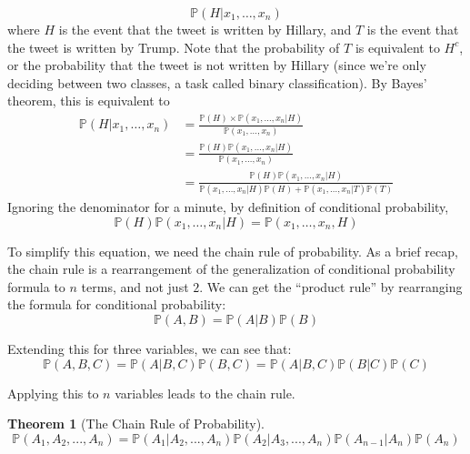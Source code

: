 \documentclass[12pt]{article} \usepackage{amsmath,amssymb,amsthm}
\newtheorem{theorem}{Theorem}[section] \newtheorem*{remark}{Remark}
\begin{document}
$$\mathbb{P}(H|x_1, \dots, x_n)$$
where $H$ is the event that the tweet is written by Hillary, and $T$ is the
event that the tweet is written by Trump. Note that the probability of $T$ is
equivalent to $H^c$, or the probability that the tweet is not written by Hillary
(since we're only deciding between two classes, a task called binary
classification). By Bayes' theorem, this is equivalent to
\begin{equation}
\begin{split}
  \mathbb{P}(H|x_1, \dots, x_n) &= \frac{\mathbb{P}(H) \times
                                  \mathbb{P}(x_1, \dots, x_n|H)}{\mathbb{P}(x_1, \dots, x_n)}\\
                                &= \frac{\mathbb{P}(H)\mathbb{P}(x_1, \dots, x_n|H)}{\mathbb{P}(x_1, \dots,
                                  x_n)}\\ 
                                &= \frac{\mathbb{P}(H)\mathbb{P}(x_1, \dots, x_n|H)}{\mathbb{P}(x_1,
                                  \dots, x_n|H)\mathbb{P}(H)+\mathbb{P}(x_1, \dots, x_n|T)\mathbb{P}(T)}
\end{split}
\end{equation}
Ignoring the denominator for a minute, by definition of conditional probability,
$$\mathbb{P}(H)\mathbb{P}(x_1, \dots, x_n|H) = \mathbb{P}(x_1, \dots, x_n, H)$$

To simplify this equation, we need the chain rule of probability. As a brief
recap, the chain rule is a rearrangement of the generalization of conditional
probability formula to $n$ terms, and not just $2$. We can get the ``product
rule'' by rearranging the formula for conditional probability:
$$\mathbb{P}(A,B) = \mathbb{P}(A|B) \mathbb{P}(B)$$

Extending this for three variables, we can see that:
$$\mathbb{P}(A,B,C) = \mathbb{P}(A|B,C) \mathbb{P}(B,C) = \mathbb{P}(A|B,C)
\mathbb{P}(B|C) \mathbb{P}(C)$$

Applying this to $n$ variables leads to the chain rule.
\begin{theorem}[The Chain Rule of Probability]
$$\mathbb{P}(A_1, A_2, ..., A_n) = \mathbb{P}(A_1| A_2, ..., A_n)\mathbb{P}(A_2| A_3, ..., A_n) \mathbb{P}(A_{n-1}|A_n) \mathbb{P}(A_n)$$
\end{theorem}
\end{document}
